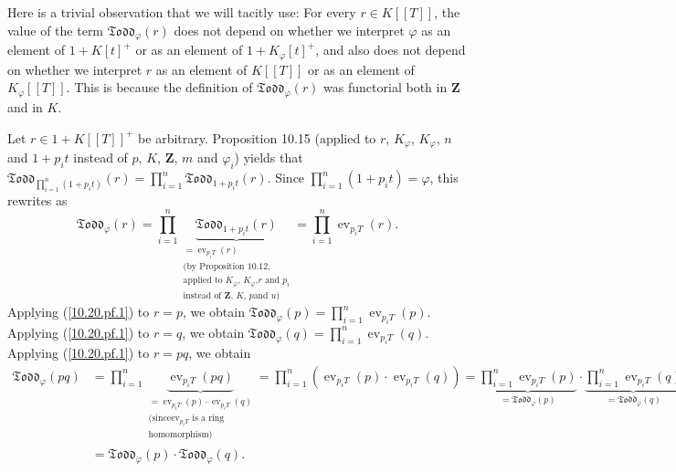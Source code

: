 \documentclass[numbers=enddot,12pt,final,onecolumn,notitlepage]{scrartcl}%
\begin{document}
Here is a trivial observation that we will tacitly use: For every $r\in
K\left[  \left[  T\right]  \right]  $, the value of the term $\mathfrak{Todd}%
_{\varphi}\left(  r\right)  $ does not depend on whether we interpret
$\varphi$ as an element of $1+K\left[  t\right]  ^{+}$ or as an element of
$1+K_{\varphi}\left[  t\right]  ^{+}$, and also does not depend on whether we
interpret $r$ as an element of $K\left[  \left[  T\right]  \right]  $ or as an
element of $K_{\varphi}\left[  \left[  T\right]  \right]  $. This is because
the definition of $\mathfrak{Todd}_{\varphi}\left(  r\right)  $ was functorial
both in $\mathbf{Z}$ and in $K$.

Let $r\in1+K\left[  \left[  T\right]  \right]  ^{+}$ be arbitrary. Proposition
10.15 (applied to $r$, $K_{\varphi}$, $K_{\varphi}$, $n$ and $1+p_{i}t$
instead of $p$, $K$, $\mathbf{Z}$, $m$ and $\varphi_{i}$) yields that
$\mathfrak{Todd}_{\prod\limits_{i=1}^{n}\left(  1+p_{i}t\right)  }\left(
r\right)  =\prod\limits_{i=1}^{n}\mathfrak{Todd}_{1+p_{i}t}\left(  r\right)
$. Since $\prod\limits_{i=1}^{n}\left(  1+p_{i}t\right)  =\varphi$, this
rewrites as%
\begin{equation}
\mathfrak{Todd}_{\varphi}\left(  r\right)  =\prod\limits_{i=1}^{n}%
\underbrace{\mathfrak{Todd}_{1+p_{i}t}\left(  r\right)  }%
_{\substack{=\operatorname*{ev}\nolimits_{p_{i}T}\left(  r\right)  \\\text{(by
Proposition 10.12,}\\\text{applied to }K_{\varphi}\text{, }K_{\varphi}\text{,
}r\text{ and }p_{i}\\\text{instead of }\mathbf{Z}\text{, }K\text{, }p\text{
and }u\text{)}}}=\prod\limits_{i=1}^{n}\operatorname*{ev}\nolimits_{p_{i}%
T}\left(  r\right)  . \label{10.20.pf.1}%
\end{equation}
Applying (\ref{10.20.pf.1}) to $r=p$, we obtain $\mathfrak{Todd}_{\varphi
}\left(  p\right)  =\prod\limits_{i=1}^{n}\operatorname*{ev}\nolimits_{p_{i}%
T}\left(  p\right)  $. Applying (\ref{10.20.pf.1}) to $r=q$, we obtain
$\mathfrak{Todd}_{\varphi}\left(  q\right)  =\prod\limits_{i=1}^{n}%
\operatorname*{ev}\nolimits_{p_{i}T}\left(  q\right)  $. Applying
(\ref{10.20.pf.1}) to $r=pq$, we obtain
\begin{align*}
\mathfrak{Todd}_{\varphi}\left(  pq\right)   &  =\prod\limits_{i=1}%
^{n}\underbrace{\operatorname*{ev}\nolimits_{p_{i}T}\left(  pq\right)
}_{\substack{=\operatorname*{ev}\nolimits_{p_{i}T}\left(  p\right)
\cdot\operatorname*{ev}\nolimits_{p_{i}T}\left(  q\right)  \\\text{(since
}\operatorname*{ev}\nolimits_{p_{i}T}\text{ is a ring}\\\text{homomorphism)}%
}}=\prod\limits_{i=1}^{n}\left(  \operatorname*{ev}\nolimits_{p_{i}T}\left(
p\right)  \cdot\operatorname*{ev}\nolimits_{p_{i}T}\left(  q\right)  \right)
=\underbrace{\prod\limits_{i=1}^{n}\operatorname*{ev}\nolimits_{p_{i}T}\left(
p\right)  }_{=\mathfrak{Todd}_{\varphi}\left(  p\right)  }\cdot
\underbrace{\prod\limits_{i=1}^{n}\operatorname*{ev}\nolimits_{p_{i}T}\left(
q\right)  }_{=\mathfrak{Todd}_{\varphi}\left(  q\right)  }\\
&  =\mathfrak{Todd}_{\varphi}\left(  p\right)  \cdot\mathfrak{Todd}_{\varphi
}\left(  q\right)  .
\end{align*}
\end{document}
